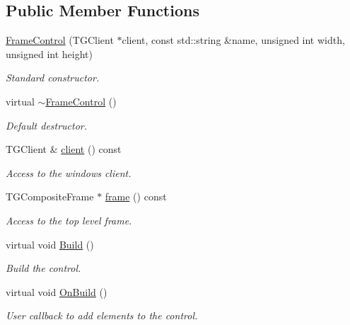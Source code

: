 \subsection*{Public Member Functions}
\begin{DoxyCompactItemize}
\item 
\hyperlink{class_d_d4hep_1_1_frame_control_aaecdd9166d4089a7e7892b88f4359126}{FrameControl} (TGClient $\ast$client, const std::string \&name, unsigned int width, unsigned int height)
\begin{DoxyCompactList}\small\item\em Standard constructor. \item\end{DoxyCompactList}\item 
virtual \hyperlink{class_d_d4hep_1_1_frame_control_a84ff9b8462de97610195757d2cce4dd8}{$\sim$FrameControl} ()
\begin{DoxyCompactList}\small\item\em Default destructor. \item\end{DoxyCompactList}\item 
TGClient \& \hyperlink{class_d_d4hep_1_1_frame_control_a3346070b9e66719ae771c541adb196fd}{client} () const 
\begin{DoxyCompactList}\small\item\em Access to the windows client. \item\end{DoxyCompactList}\item 
TGCompositeFrame $\ast$ \hyperlink{class_d_d4hep_1_1_frame_control_a7f27f01bc5c08e339639d2d005e7f790}{frame} () const 
\begin{DoxyCompactList}\small\item\em Access to the top level frame. \item\end{DoxyCompactList}\item 
virtual void \hyperlink{class_d_d4hep_1_1_frame_control_a4ef181d24de565d17511bb9f5098184c}{Build} ()
\begin{DoxyCompactList}\small\item\em Build the control. \item\end{DoxyCompactList}\item 
virtual void \hyperlink{class_d_d4hep_1_1_frame_control_a934ef76420162167364133e43c7be8b5}{OnBuild} ()
\begin{DoxyCompactList}\small\item\em User callback to add elements to the control. \item\end{DoxyCompactList}\item 

\end{DoxyCompactItemize}
